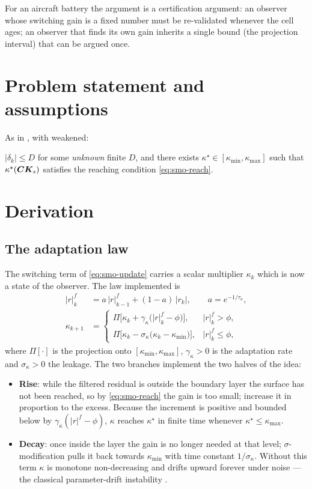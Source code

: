 For an aircraft battery the argument is a certification argument: an observer whose switching
gain is a fixed number must be re-validated whenever the cell ages; an observer that finds its own
gain inherits a single bound (the projection interval) that can be argued once.

\section{Problem statement and assumptions}
As in , with  weakened:
\begin{assumption}\label{as:smoa-bound}
$|\delta_k|\le D$ for some \emph{unknown} finite $D$, and there exists
$\kappa^\star\in[\kappa_{\min},\kappa_{\max}]$ such that $\kappa^\star(\bm{C}\bm{K}_s)$ satisfies the
reaching condition \eqref{eq:smo-reach}.
\end{assumption}

\section{Derivation}

\subsection{The adaptation law}
The switching term of \eqref{eq:smo-update} carries a scalar multiplier $\kappa_k$ which is now a
state of the observer.  The law implemented is
\begin{align}
|r|^{f}_k &= a\,|r|^{f}_{k-1} + (1-a)\,|r_k| , \qquad a = e^{-1/\tau_a} , \label{eq:smoa-filter}\\
\kappa_{k+1} &=
\begin{cases}
\Pi\big[\kappa_k + \gamma_\kappa\big(|r|^f_k - \phi\big)\big], & |r|^f_k > \phi ,\\[2pt]
\Pi\big[\kappa_k - \sigma_\kappa\big(\kappa_k - \kappa_{\min}\big)\big], & |r|^f_k \le \phi ,
\end{cases}
\label{eq:smoa-adapt}
\end{align}
where $\Pi[\cdot]$ is the projection onto $[\kappa_{\min},\kappa_{\max}]$, $\gamma_\kappa>0$ is
the adaptation rate and $\sigma_\kappa>0$ the leakage.  The two branches implement the two halves
of the idea:
\begin{itemize}[nosep]
\item \textbf{Rise}: while the filtered residual is outside the boundary layer the surface has not
been reached, so by \eqref{eq:smo-reach} the gain is too small; increase it in proportion to the
excess.  Because the increment is positive and bounded below by $\gamma_\kappa(|r|^f-\phi)$,
$\kappa$ reaches $\kappa^\star$ in finite time whenever $\kappa^\star\le\kappa_{\max}$.
\item \textbf{Decay}: once inside the layer the gain is no longer needed at that level;
$\sigma$-modification pulls it back towards $\kappa_{\min}$ with time constant
$1/\sigma_\kappa$.  Without this term $\kappa$ is monotone non-decreasing and drifts upward
forever under noise --- the classical parameter-drift instability
\cite{ioannou1984sigma}.
\end{itemize}

